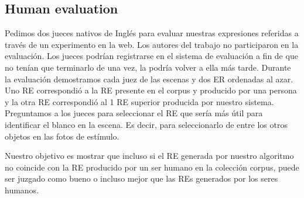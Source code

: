  

\subsection{Human evaluation} \label{sec:humanevaluation}




Pedimos dos jueces nativos de Ingl\'es para evaluar nuestras expresiones referidas a trav\'es de un experimento en la web. Los autores del trabajo no participaron en la evaluaci\'on. Los jueces podr\'{i}an registrarse en el sistema de evaluaci\'on a fin de que no ten\'{i}an que terminarlo de una vez, la podr\'{i}a volver a ella m\'as tarde. Durante la evaluaci\'on demostramos cada juez de las escenas y dos ER ordenadas al azar. Uno RE correspondi\'o a la RE presente en el corpus y producido por una persona y la otra RE correspondi\'o al 1 RE superior producida por nuestro sistema. Preguntamos a los jueces para seleccionar el RE que ser\'{i}a m\'as \'util para identificar el blanco en la escena. Es decir, para seleccionarlo de entre los otros objetos en las fotos de est\'{i}mulo.

Nuestro objetivo es mostrar que incluso si el RE generada por nuestro algoritmo no coincide con la RE producido por un ser humano en la colecci\'on corpus, puede ser juzgado como bueno o incluso mejor que las REs generados por los seres humanos.

